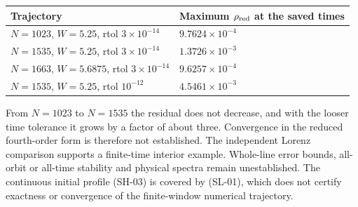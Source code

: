 \begin{center}\small\begin{tabularx}{\textwidth}{@{}>{\raggedright\arraybackslash}X>{\raggedright\arraybackslash}X@{}}\toprule
Trajectory & Maximum $\rho_{\rm red}$ at the saved times\\\midrule
$N=1023$, $W=5.25$, rtol $3\times10^{-14}$ & $9.7624\times10^{-4}$\\
$N=1535$, $W=5.25$, rtol $3\times10^{-14}$ & $1.3726\times10^{-3}$\\
$N=1663$, $W=5.6875$, rtol $3\times10^{-14}$ & $9.6257\times10^{-4}$\\
$N=1535$, $W=5.25$, rtol $10^{-12}$ & $4.5461\times10^{-3}$\\
\bottomrule\end{tabularx}\end{center}

From $N=1023$ to $N=1535$ the residual does not decrease, and with the looser time tolerance it grows by a factor of about three. Convergence in the reduced fourth-order form is therefore not established. The independent Lorenz comparison supports a finite-time interior example. Whole-line error bounds, all-orbit or all-time stability and physical spectra remain unestablished. The continuous initial profile (SH-03) is covered by (SL-01), which does not certify exactness or convergence of the finite-window numerical trajectory.
